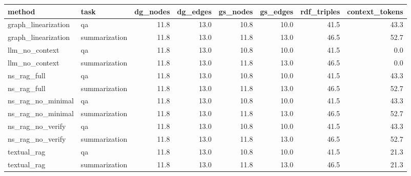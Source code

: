 \begin{tabular}{llrrrrrr}
\toprule
method & task & dg_nodes & dg_edges & gs_nodes & gs_edges & rdf_triples & context_tokens \\
\midrule
graph_linearization & qa & 11.8 & 13.0 & 10.8 & 10.0 & 41.5 & 43.3 \\
graph_linearization & summarization & 11.8 & 13.0 & 11.8 & 13.0 & 46.5 & 52.7 \\
llm_no_context & qa & 11.8 & 13.0 & 10.8 & 10.0 & 41.5 & 0.0 \\
llm_no_context & summarization & 11.8 & 13.0 & 11.8 & 13.0 & 46.5 & 0.0 \\
ns_rag_full & qa & 11.8 & 13.0 & 10.8 & 10.0 & 41.5 & 43.3 \\
ns_rag_full & summarization & 11.8 & 13.0 & 11.8 & 13.0 & 46.5 & 52.7 \\
ns_rag_no_minimal & qa & 11.8 & 13.0 & 10.8 & 10.0 & 41.5 & 43.3 \\
ns_rag_no_minimal & summarization & 11.8 & 13.0 & 11.8 & 13.0 & 46.5 & 52.7 \\
ns_rag_no_verify & qa & 11.8 & 13.0 & 10.8 & 10.0 & 41.5 & 43.3 \\
ns_rag_no_verify & summarization & 11.8 & 13.0 & 11.8 & 13.0 & 46.5 & 52.7 \\
textual_rag & qa & 11.8 & 13.0 & 10.8 & 10.0 & 41.5 & 21.3 \\
textual_rag & summarization & 11.8 & 13.0 & 11.8 & 13.0 & 46.5 & 21.3 \\
\bottomrule
\end{tabular}
